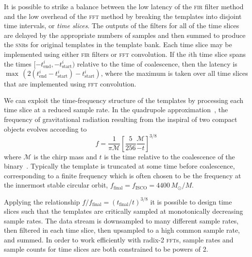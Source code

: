   It is possible to strike a balance between the low latency of the \textsc{fir} filter method and the low overhead of the \textsc{fft} method by breaking the templates into disjoint time intervals, or {\em time slices}.  The outputs of the filters for all of the time slices are delayed by the appropriate numbers of samples and then summed to produce the \textsc{snr}s for original templates in the template bank.  Each time slice may be implemented using either \textsc{fir} filters or \textsc{fft} convolution.  If the $i$th time slice spans the times $[-t_\mathrm{end}^i, -t_\mathrm{start}^i)$ relative to the time of coalescence, then the latency is $\max \, (2 (t_\mathrm{end}^i - t_\mathrm{start}^i) - t_\mathrm{start}^i)$, where the maximum is taken over all time slices that are implemented using \textsc{fft} convolution.

We can exploit the time-frequency structure of the templates by processing each time slice at a reduced sample rate.  In the quadrupole approximation~\cite{finn1993}, the frequency of gravitational radiation resulting from the inspiral of two compact objects evolves according to
\begin{equation}
\label{eq:fgw}
f = \frac{1}{\mathcal{\pi M}} \left[ \frac{5}{256}\frac{\mathcal{M}}{-t} \right]^{3/8}
\end{equation}
where $\mathcal{M}$ is the chirp mass and $t$ is the time relative to the coalescence of the binary~\cite{kidder1992, blanchet2002, findchirppaper, hanna2009}.  Typically the template is truncated at some time before coalescence, corresponding to a finite frequency which is often chosen to be the frequency at the innermost stable circular orbit, $f_\mathrm{final} = f_\mathrm{ISCO} = 4400 \, M_\odot / M$.

Applying the relationship $f/f_\mathrm{final} = (t_\mathrm{final}/t)^{3/8}$ it is possible to design time slices such that the templates are critically sampled at monotonically decreasing sample rates.  The data stream is downsampled to many different sample rates, then filtered in each time slice, then upsampled to a high common sample rate, and summed.  In order to work efficiently with radix-2 \textsc{fft}s, sample rates and sample counts for time slices are both constrained to be powers of 2.


